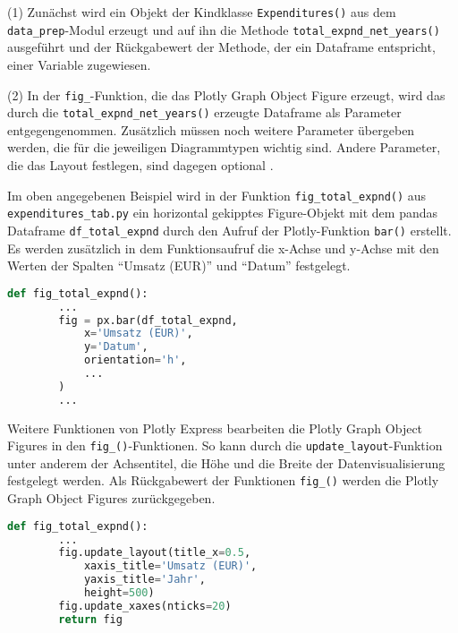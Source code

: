     (1) Zunächst wird ein Objekt der Kindklasse \texttt{Expenditures()} aus dem \texttt{data\_prep}-Modul erzeugt 
    und auf ihn die Methode \texttt{total\_expnd\_net\_years()} ausgeführt und der Rückgabewert der Methode, der ein Dataframe entspricht, einer
    Variable zugewiesen.



    (2) In der \texttt{fig\_}-Funktion, die das Plotly Graph Object Figure erzeugt, wird das durch die \texttt{total\_expnd\_net\_years()} erzeugte Dataframe
    als Parameter entgegengenommen. Zusätzlich müssen noch weitere Parameter übergeben werden, die für die jeweiligen Diagrammtypen wichtig sind.
    Andere Parameter, die das Layout festlegen, sind dagegen optional \cite[vgl.][]{plotly_plotlygraph_objectsbar_2021}.
    
    Im oben angegebenen Beispiel wird in der Funktion \texttt{fig\_total\_expnd()} aus \texttt{expenditures\_tab.py} ein horizontal gekipptes Figure-Objekt
    mit dem pandas Dataframe \texttt{df\_total\_expnd} durch den Aufruf der Plotly-Funktion \texttt{bar()} erstellt. 
    Es werden zusätzlich in dem Funktionsaufruf die x-Achse und y-Achse mit den Werten der Spalten \enquote{Umsatz (EUR)} und \enquote{Datum} festgelegt. 

    \begin{lstlisting}[language=Python, caption=Funktion fig\_total\_expnd() Auszug 1]
    def fig_total_expnd():
        ...
        fig = px.bar(df_total_expnd,
            x='Umsatz (EUR)',
            y='Datum',
            orientation='h',
            ...
        )
        ...
    \end{lstlisting}
    
    Weitere Funktionen von Plotly Express bearbeiten die Plotly Graph Object Figures in den \texttt{fig\_()}-Funktionen. 
    So kann durch die \texttt{update\_layout}-Funktion unter anderem der Achsentitel, die Höhe und die Breite der Datenvisualisierung 
    festgelegt werden. Als Rückgabewert der Funktionen \texttt{fig\_()} werden die Plotly Graph Object Figures zurückgegeben.

    \begin{lstlisting}[language=Python, caption=fig\_total\_expnd() Auszug 2]  
    def fig_total_expnd():
        ...
        fig.update_layout(title_x=0.5,
            xaxis_title='Umsatz (EUR)',
            yaxis_title='Jahr',
            height=500)
        fig.update_xaxes(nticks=20)         
        return fig
    \end{lstlisting}

